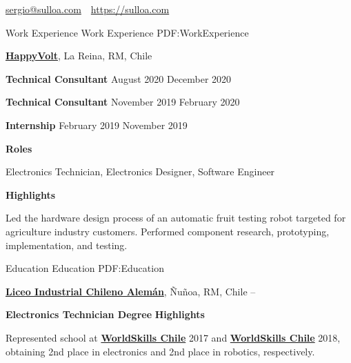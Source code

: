 \documentclass[letterpaper,yyyy,draft]{simpleresumecv}
\newcommand{\CVAuthor}{Sergio A. Ulloa B.}
\newcommand{\CVWebpage}{https://sulloa.com}
\begin{document}
\makeatletter
\let\@oddfoot\@empty
\let\@evenfoot\@empty
\makeatother

\Title{\CVAuthor}

{
    \begin{SubTitle}
    \href{mailto:sergio@sulloa.com}{sergio@sulloa.com}
    \,\SubBulletSymbol\,
    \href{\CVWebpage}{\url{\CVWebpage}}
    \end{SubTitle}
}

\begin{Body}


\Section
{Work\newline
Experience}
{Work Experience}
{PDF:WorkExperience}
{
    \Entry
    \href{https://happyvolt.com/}{\textbf{HappyVolt}},
    La Reina, RM, Chile

    \BulletItem
    \textbf{Technical Consultant}
    \hfill
    August 2020
    December 2020

    \Gap
    \BulletItem
    \textbf{Technical Consultant}
    \hfill
    November 2019
    February 2020

    \Gap
    \BulletItem
    \textbf{Internship}
    \hfill
    February 2019
    November 2019

    \Gap
    \BulletItem
    \textbf{Roles}
    \hfill
    \begin{Detail}
    \SubBulletItem
    Electronics Technician, Electronics Designer, Software Engineer  
    \end{Detail}

    \Gap
    \BulletItem
    \textbf{Highlights}
    \hfill
    \begin{Detail}
    \SubBulletItem
    Led the hardware design process of an automatic fruit testing robot targeted for agriculture industry customers. Performed component research, prototyping, implementation, and testing.
    \end{Detail}
}


\Section
{Education}
{Education}
{PDF:Education}
{
    \Entry
    \href{https://www.lichan.cl/}{\textbf{Liceo Industrial Chileno Alemán}},
    Ñuñoa, RM, Chile
    \hfill
     -- 

    \Gap
    \BulletItem
    \textbf{Electronics Technician Degree}
    \Gap
    \BulletItem
    \textbf{Highlights}
    \begin{Detail}
    \SubBulletItem
    Represented school at \href{https://worldskills.org/}{\textbf{WorldSkills Chile}} 2017 and \href{https://worldskills.org/}{\textbf{WorldSkills Chile}} 2018, obtaining 2nd place in electronics and 2nd place in robotics, respectively.
    \end{Detail}
}


\end{Body}
\end{document}

